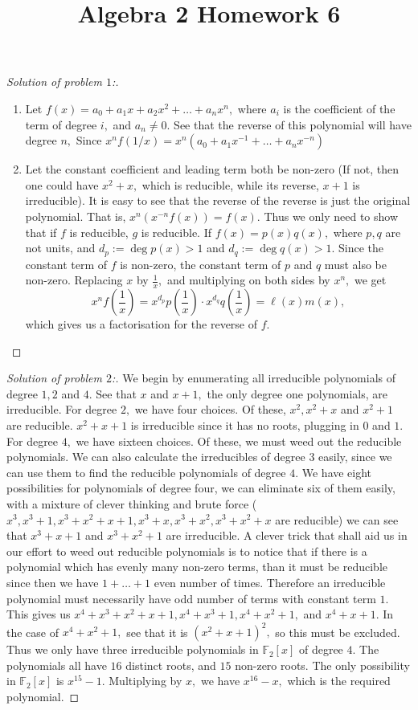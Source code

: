 \documentclass[letterpaper,11pt,twoside]{article}
\title{Algebra 2 Homework 6}
\theoremstyle{proposition}
\theoremstyle{definition}
\theoremstyle{theorem}
\theoremstyle{definition}
\theoremstyle{definition}
\theoremstyle{definition}
\theoremstyle{lemma}
\theoremstyle{definition}
\theoremstyle{definition}
\theoremstyle{corollary}
\theoremstyle{definition}
\theoremstyle{definition}
\theoremstyle{definition}
\begin{document}
	\maketitle
	\begin{proof}[Solution of problem $1$:]
		\begin{enumerate}
			\item Let $f(x)= a_0 + a_1x + a_2x^2 + \dots + a_n x^n,$ where $a_i$ is the coefficient of the term of degree $i,$ and $a_n \neq 0.$ See that 
			the reverse of this polynomial will have degree $n,$ Since $x^nf(1/x)= x^n\left(a_0 + a_1x^{-1} + \dots + a_n x^{-n} \right)$
			\item Let the constant coefficient and leading term both be non-zero (If not, then one could have $x^2+x,$ which is reducible, while its 
			reverse, $x+1$ is irreducible). It is easy to see that the reverse of the reverse is just the original polynomial. That is, $x^n 
			(x^{-n}f(x))=f(x).$ Thus we only need to show that if $f$ is reducible, $g$ is reducible. If $f(x)=p(x)q(x),$ where $p,q$ are not units, and 
			$d_p := \deg p(x)>1$ and $d_q := \deg q(x)>1.$ Since the constant term of $f$ is non-zero, the constant term of $p$ and $q$ must also be 
			non-zero. Replacing $x$ by $\frac{1}{x},$ and multiplying on both sides by $x^n,$ we get 
			$$x^nf\left(\frac{1}{x}\right)= x^{d_p}p\left(\frac{1}{x}\right) \cdot x^{d_q}q\left(\frac{1}{x}\right) = \ell (x) m(x),$$ which gives us a 
			factorisation for the reverse of $f.$  
		\end{enumerate}
	\end{proof}
	\begin{proof}[Solution of problem $2$:]
	We begin by enumerating all irreducible polynomials of degree $1, 2$ and $4.$ See that $x$ and $x+1,$ the only degree one polynomials, are irreducible. 
	For degree $2,$ we have four choices. Of these, $x^2, x^2+x$ and $x^2+1$ are reducible. $x^2+x+1$ is irreducible since it has no roots, plugging in $0$ 
	and $1$. For degree $4,$ we have sixteen choices. Of these, we must weed out the reducible polynomials. We can also calculate the irreducibles of degree 
	$3$ easily, since we can use them to find the reducible polynomials of degree $4.$ We have eight possibilities for polynomials of degree four, we can 
	eliminate six of them easily, with a mixture of clever thinking and brute force ($x^3,x^3+1,x^3+x^2+x+1, x^3+x,x^3+x^2, x^3+x^2+x$ are reducible) we can 
	see that $x^3+x+1$ and $x^3+x^2+1$ are irreducible. A clever trick that shall aid us in our effort to weed out reducible polynomials is to notice that 
	if there is a polynomial which has evenly many non-zero terms, than it must be reducible since then we have $1+ \dots +1$ even number of times. 
	Therefore an irreducible polynomial must necessarily have odd number of terms with constant term $1.$ This gives us $x^4+x^3+x^2+x+1, x^4+x^3+1, 
	x^4+x^2+1,$ and $x^4+x+1.$ In the case of  $x^4+x^2+1,$ see that it is $(x^2+x+1)^2,$ so this must be excluded. Thus we only have three irreducible 
	polynomials in $\mathbb{F}_2[x]$ of degree $4.$ The polynomials all have $16$ distinct roots, and $15$ non-zero roots. The only possibility in 
	$\mathbb{F}_2[x]$ is $x^{15}-1.$ Multiplying by $x,$ we have $x^{16}-x,$ which is the required polynomial.  
\end{proof}
\end{document}
